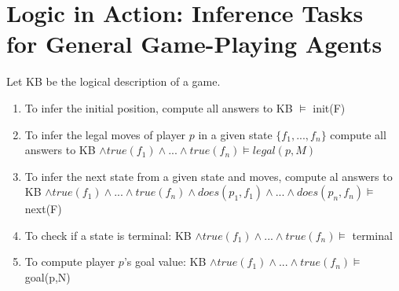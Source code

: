 \section[Logic in Action]{Logic in Action: Inference Tasks for General Game-Playing Agents}
Let KB be the logical description of a game.
\begin{enumerate}
    \item To infer the initial position, compute all answers to KB $\models$ init(F)
    \item To infer the legal moves of player $p$ in a given state
        $\{f_1,...,f_n\}$ compute all answers to KB $\land true(f_1) \land ...
        \land true(f_n) \models legal(p,M)$
    \item To infer the next state from a given state and moves, compute al
        answers to KB $\land true(f_1) \land ... \land true(f_n) \land
        does(p_1,f_1) \land ... \land does(p_n,f_n) \models$ next(F)
    \item To check if a state is terminal: KB $\land true(f_1) \land ... \land
        true(f_n) \models$ terminal
    \item To compute player $p$'s goal value: KB $\land true(f_1) \land ...
        \land true(f_n) \models$ goal(p,N)
\end{enumerate}
